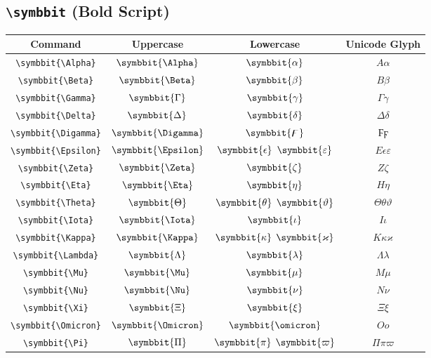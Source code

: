 \documentclass[12pt,a4paper]{article}
\begin{document}
\newpage

\subsection*{\texttt{\textbackslash{}symbbit} (Bold Script)}

\begin{longtable}{|c|c|c|c|}
\hline
\textbf{Command} & \textbf{Uppercase} & \textbf{Lowercase} & \textbf{Unicode Glyph} \\
\hline
\verb|\symbbit{\Alpha}| & $\symbbit{\Alpha}$ & $\symbbit{\alpha}$ & $ Α 𝛼 $ \\
\verb|\symbbit{\Beta}| & $\symbbit{\Beta}$ & $\symbbit{\beta}$ & $ Β 𝛽 $ \\
\verb|\symbbit{\Gamma}| & $\symbbit{\Gamma}$ & $\symbbit{\gamma}$ & $ Γ 𝛾 $ \\
\verb|\symbbit{\Delta}| & $\symbbit{\Delta}$ & $\symbbit{\delta}$ & $ Δ 𝛿 $ \\
\verb|\symbbit{\Digamma}| & $\symbbit{\Digamma}$ & $\symbbit{\digamma}$ & $ Ϝ ϝ $ \\
\verb|\symbbit{\Epsilon}| & $\symbbit{\Epsilon}$ & $\symbbit{\epsilon}$ $\symbbit{\varepsilon}$ & $ Ε 𝜖 𝜀 $ \\
\verb|\symbbit{\Zeta}| & $\symbbit{\Zeta}$ & $\symbbit{\zeta}$ & $ Ζ 𝜁 $ \\
\verb|\symbbit{\Eta}| & $\symbbit{\Eta}$ & $\symbbit{\eta}$ & $ Η 𝜂 $ \\
\verb|\symbbit{\Theta}| & $\symbbit{\Theta}$ & $\symbbit{\theta}$ $\symbbit{\vartheta}$ & $ Θ 𝜃 𝜗 $ \\
\verb|\symbbit{\Iota}| & $\symbbit{\Iota}$ & $\symbbit{\iota}$ & $ Ι 𝜄 $ \\
\verb|\symbbit{\Kappa}| & $\symbbit{\Kappa}$ & $\symbbit{\kappa}$ $\symbbit{\varkappa}$ & $ Κ 𝜅 𝜘 $ \\
\verb|\symbbit{\Lambda}| & $\symbbit{\Lambda}$ & $\symbbit{\lambda}$ & $ Λ 𝜆 $ \\
\verb|\symbbit{\Mu}| & $\symbbit{\Mu}$ & $\symbbit{\mu}$ & $ Μ 𝜇 $ \\
\verb|\symbbit{\Nu}| & $\symbbit{\Nu}$ & $\symbbit{\nu}$ & $ Ν 𝜈 $ \\
\verb|\symbbit{\Xi}| & $\symbbit{\Xi}$ & $\symbbit{\xi}$ & $ Ξ 𝜉 $ \\
\verb|\symbbit{\Omicron}| & $\symbbit{\Omicron}$ & $\symbbit{\omicron}$ & $ Ο 𝜊 $ \\
\verb|\symbbit{\Pi}| & $\symbbit{\Pi}$ & $\symbbit{\pi}$ $\symbbit{\varpi}$ & $ Π 𝜋 𝜛 $ \\

\end{longtable}
\end{document}
